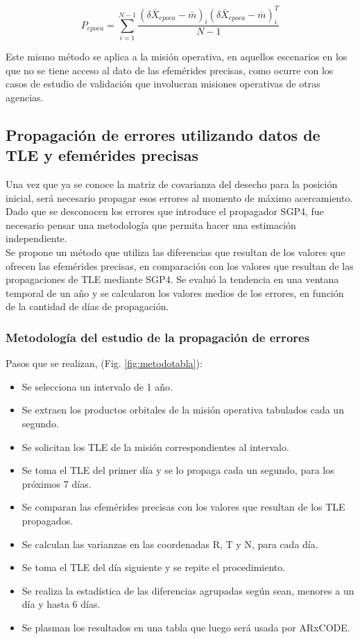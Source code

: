 \begin{equation}
 P_{epoca}=\sum_{i=1}^{N-1} \frac{(\delta \bar{X}_{epoca}-\bar{m})_{i}(\delta \bar{X}_{epoca}-\bar{m})_{i}^{T}}{N-1}
\end{equation}

Este mismo m\'etodo se aplica a la misi\'on operativa, en aquellos escenarios en los que no se tiene acceso al dato de las efem\'erides precisas, como ocurre con los casos de estudio de validaci\'on que involucran misiones operativas de otras agencias.\\

\subsection{Propagaci\'on de errores utilizando datos de TLE y efem\'erides precisas}\label{subsec:tablaprop}
Una vez que ya se conoce la matriz de covarianza del desecho para la posici\'on inicial, ser\'a necesario propagar esos errores al momento de m\'aximo acercamiento.
Dado que se desconocen los errores que introduce el propagador SGP4, fue necesario pensar una metodolog\'ia que permita hacer una estimaci\'on independiente.\\

Se propone un m\'etodo que utiliza las diferencias que resultan de los valores que ofrecen las efem\'erides precisas, en comparaci\'on con los valores que resultan de las propagaciones de TLE mediante SGP4. Se evalu\'o la tendencia en una ventana temporal de un a\~no y se calcularon los valores medios de los errores, en funci\'on de la cantidad de d\'ias de propagaci\'on.

\subsubsection*{Metodolog\'ia del estudio de la propagaci\'on de errores}\label{subsec:errorProp}
Pasos que se realizan, (Fig. \ref{fig:metodotabla}):
\begin{itemize}
\itemsep0em
\item Se selecciona un intervalo de 1 a\~no.
\item Se extraen los productos orbitales de la misi\'on operativa tabulados cada un segundo.
\item Se solicitan los TLE de la misi\'on correspondientes al intervalo.
\item Se toma el TLE del primer d\'ia y se lo propaga cada un segundo, para los pr\'oximos 7 d\'ias.
\item Se comparan las efem\'erides precisas con los valores que resultan de los TLE propagados.
\item Se calculan las varianzas en las coordenadas R, T y N, para cada d\'ia.
\item Se toma el TLE del d\'ia siguiente y se repite el procedimiento.
\item Se realiza la estad\'istica  de las diferencias agrupadas seg\'un sean, menores a un d\'ia y hasta 6 d\'ias.
\item Se plasman los resultados en una tabla que luego ser\'a usada por ARxCODE.
\end{itemize}

